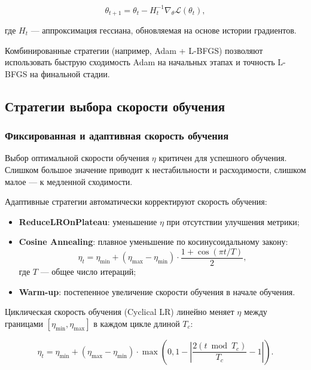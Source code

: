 \begin{equation}
\theta_{t+1} = \theta_t - H_t^{-1} \nabla_{\theta} \mathcal{L}(\theta_t),
\end{equation}

где $H_t$ — аппроксимация гессиана, обновляемая на основе истории градиентов.

Комбинированные стратегии (например, Adam + L-BFGS) позволяют использовать быструю сходимость Adam на начальных этапах и точность L-BFGS на финальной стадии.

\subsection{Стратегии выбора скорости обучения}

\subsubsection{Фиксированная и адаптивная скорость обучения}

Выбор оптимальной скорости обучения $\eta$ критичен для успешного обучения. Слишком большое значение приводит к нестабильности и расходимости, слишком малое — к медленной сходимости.

Адаптивные стратегии автоматически корректируют скорость обучения:

\begin{itemize}
    \item \textbf{ReduceLROnPlateau}: уменьшение $\eta$ при отсутствии улучшения метрики;
    \item \textbf{Cosine Annealing}: плавное уменьшение по косинусоидальному закону:
    \begin{equation}
    \eta_t = \eta_{\min} + (\eta_{\max} - \eta_{\min}) \cdot \frac{1 + \cos(\pi t / T)}{2},
    \end{equation}
    где $T$ — общее число итераций;
    \item \textbf{Warm-up}: постепенное увеличение скорости обучения в начале обучения.
\end{itemize}

Циклическая скорость обучения (Cyclical LR) линейно меняет $\eta$ между границами $[\eta_{\min}, \eta_{\max}]$ в каждом цикле длиной $T_c$:

\begin{equation}
\eta_t = \eta_{\min} + (\eta_{\max} - \eta_{\min}) \cdot \max\left(0, 1 - \left| \frac{2(t \bmod T_c)}{T_c} - 1 \right| \right).
\end{equation}

